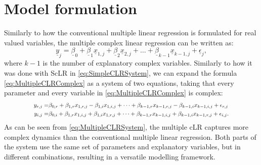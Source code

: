 \documentclass[
]{book}
\begin{document}
\hypertarget{model-formulation}{%
\section{Model formulation}\label{model-formulation}}

Similarly to how the conventional multiple linear regression is formulated for real valued variables, the multiple complex linear regression can be written as:
\begin{equation}
    \underline{y}_j = \underline{\beta}_0 + \underline{\beta}_1 \underline{x}_{1,j} + \underline{\beta}_2 \underline{x}_{2,j} + \dots + \underline{\beta}_{k-1} \underline{x}_{k-1,j} + \underline{\epsilon}_j,
    \label{eq:MultipleCLRComplex}
\end{equation}
where \(k-1\) is the number of explanatory complex variables. Similarly to how it was done with ScLR in \eqref{eq:SimpleCLRSystem}, we can expand the formula \eqref{eq:MultipleCLRComplex} as a system of two equations, taking that every parameter and every variable in \eqref{eq:MultipleCLRComplex} is complex:
\begin{equation}
    \resizebox{0.8\textwidth}{!}{$
    \begin{aligned}
        y_{r,j} = & \beta_{0,r} + \beta_{1,r} x_{1,r,j} - \beta_{1,i} x_{1,i,j} + \dots + \beta_{k-1,r} x_{k-1,r,j} - \beta_{k-1,i} x_{k-1,i,j} + \epsilon_{r,j} \\
        y_{i,j} = & \beta_{0,i} + \beta_{1,r} x_{1,i,j} + \beta_{1,i} x_{1,r,j} + \dots + \beta_{k-1,r} x_{k-1,i,j} + \beta_{k-1,i} x_{k-1,r,j} + \epsilon_{i,j} .
    \end{aligned}$}
    \label{eq:MultipleCLRSystem}
\end{equation}
As can be seen from \eqref{eq:MultipleCLRSystem}, the multiple cLR captures more complex dynamics than the conventional multiple linear regression. Both parts of the system use the same set of parameters and explanatory variables, but in different combinations, resulting in a versatile modelling framework.
\end{document}
